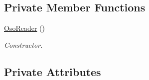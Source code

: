 \subsection*{Private Member Functions}
\begin{DoxyCompactItemize}
\item 
\hypertarget{class_oso_reader_a6792e222d40495ce57725c5410b27aab}{\hyperlink{class_oso_reader_a6792e222d40495ce57725c5410b27aab}{Oso\-Reader} ()}\label{class_oso_reader_a6792e222d40495ce57725c5410b27aab}

\begin{DoxyCompactList}\small\item\em Constructor. \end{DoxyCompactList}\end{DoxyCompactItemize}
\subsection*{Private Attributes}
